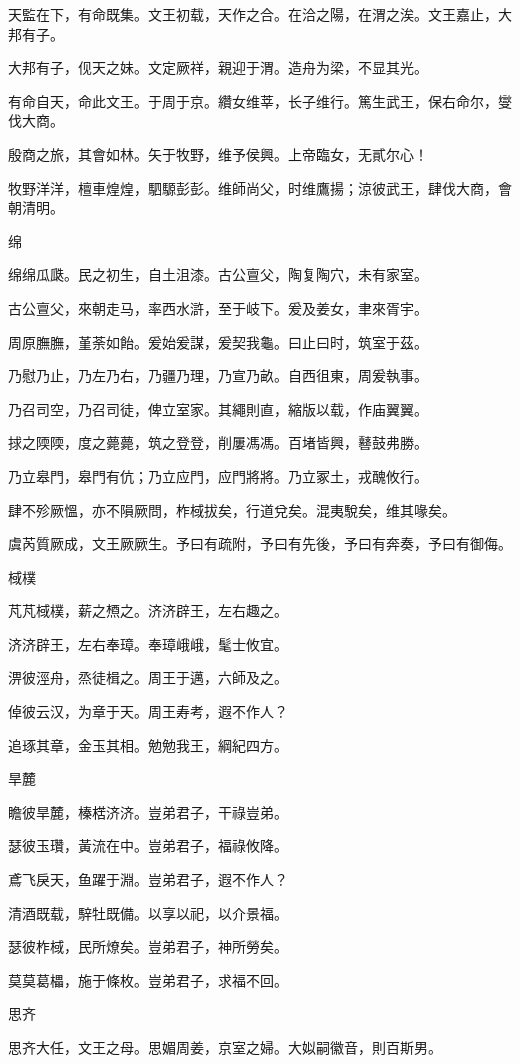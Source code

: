 天監在下，有命既集。文王初载，天作之合。在洽之陽，在渭之涘。文王嘉止，大邦有子。

大邦有子，伣天之妹。文定厥祥，親迎于渭。造舟为梁，不显其光。

有命自天，命此文王。于周于京。纘女维莘，长子维行。篤生武王，保右命尔，燮伐大商。

殷商之旅，其會如林。矢于牧野，维予侯興。上帝臨女，无貳尔心！

牧野洋洋，檀車煌煌，駟騵彭彭。维師尚父，时维鷹揚；涼彼武王，肆伐大商，會朝清明。

绵

绵绵瓜瓞。民之初生，自土沮漆。古公亶父，陶复陶穴，未有家室。

古公亶父，來朝走马，率西水滸，至于岐下。爰及姜女，聿來胥宇。

周原膴膴，堇荼如飴。爰始爰謀，爰契我龜。曰止曰时，筑室于茲。

乃慰乃止，乃左乃右，乃疆乃理，乃宣乃畝。自西徂東，周爰執事。

乃召司空，乃召司徒，俾立室家。其繩則直，縮版以载，作庙翼翼。

捄之陾陾，度之薨薨，筑之登登，削屢馮馮。百堵皆興，鼛鼓弗勝。

乃立皋門，皋門有伉；乃立应門，应門將將。乃立冢土，戎醜攸行。

肆不殄厥慍，亦不隕厥問，柞棫拔矣，行道兌矣。混夷駾矣，维其喙矣。

虞芮質厥成，文王厥厥生。予曰有疏附，予曰有先後，予曰有奔奏，予曰有御侮。

棫樸

芃芃棫樸，薪之槱之。济济辟王，左右趣之。

济济辟王，左右奉璋。奉璋峨峨，髦士攸宜。

淠彼涇舟，烝徒楫之。周王于邁，六師及之。

倬彼云汉，为章于天。周王寿考，遐不作人？

追琢其章，金玉其相。勉勉我王，綱紀四方。

旱麓

瞻彼旱麓，榛楛济济。豈弟君子，干祿豈弟。

瑟彼玉瓚，黃流在中。豈弟君子，福祿攸降。

鳶飞戾天，鱼躍于淵。豈弟君子，遐不作人？

清酒既载，騂牡既備。以享以祀，以介景福。

瑟彼柞棫，民所燎矣。豈弟君子，神所勞矣。

莫莫葛櫑，施于條枚。豈弟君子，求福不回。

思齐

思齐大任，文王之母。思媚周姜，京室之婦。大姒嗣徽音，則百斯男。

